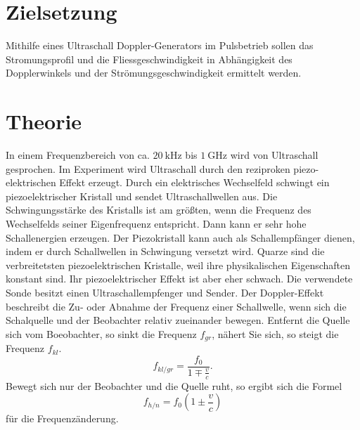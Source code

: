 \section{Zielsetzung}
\label{sec:Zielsetzung}

Mithilfe eines Ultraschall Doppler-Generators im Pulsbetrieb sollen das Stromungsprofil und die Fliessgeschwindigkeit
in Abhängigkeit des Dopplerwinkels und der Strömungsgeschwindigkeit ermittelt werden.

\section{Theorie}
\label{sec:Theorie}

In einem Frequenzbereich von ca. $\SI{20}{\kilo\Hz}$ bis $\SI{1}{\giga\Hz}$ wird von Ultraschall gesprochen.
Im Experiment wird Ultraschall durch den reziproken piezo-elektrischen Effekt erzeugt. 
Durch ein elektrisches Wechselfeld schwingt ein piezoelektrischer Kristall und sendet Ultraschallwellen aus.
Die Schwingungsstärke des Kristalls ist am größten, wenn die Frequenz des Wechselfelds seiner Eigenfrequenz entspricht. 
Dann kann er sehr hohe Schallenergien erzeugen. Der Piezokristall kann auch als Schallempfänger dienen, 
indem er durch Schallwellen in Schwingung versetzt wird. Quarze sind die verbreitetsten piezoelektrischen Kristalle, 
weil ihre physikalischen Eigenschaften konstant sind. Ihr piezoelektrischer Effekt ist aber eher schwach.
Die verwendete Sonde besitzt einen Ultraschallempfenger und Sender.
Der Doppler-Effekt beschreibt die Zu- oder Abnahme der Frequenz einer Schallwelle, wenn sich die Schalquelle und 
der Beobachter relativ zueinander bewegen. 
Entfernt die Quelle sich vom Boeobachter, so sinkt die Frequenz $f_{gr}$, nähert Sie sich, so steigt die Frequenz $f_{kl}$.
\begin{equation}\label{eq:Doppler1}
    f_{kl/gr} = \frac{f_0}{1 \mp \frac{v}{c}}.%
\end{equation}
Bewegt sich nur der Beobachter und die Quelle ruht, so ergibt sich die Formel
\begin{equation}\label{eq:Doppler2}
    f_{h/n} = f_0 \left(1 \pm \frac{v}{c}\right)
\end{equation}
für die Frequenzänderung.\\


